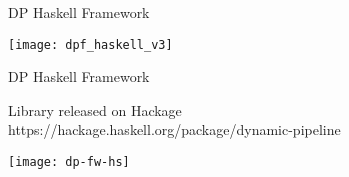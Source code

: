 \begin{frame}[fragile]{DP Haskell Framework}
  \begin{center}
    \texttt{[image: dpf\_haskell\_v3]}
  \end{center}
\end{frame}

\begin{frame}[fragile]{DP Haskell Framework}
  \begin{block}{}
    Library released on Hackage \\
    https://hackage.haskell.org/package/dynamic-pipeline
    \begin{center}
      \texttt{[image: dp-fw-hs]}
    \end{center}  
  \end{block}
\end{frame}
